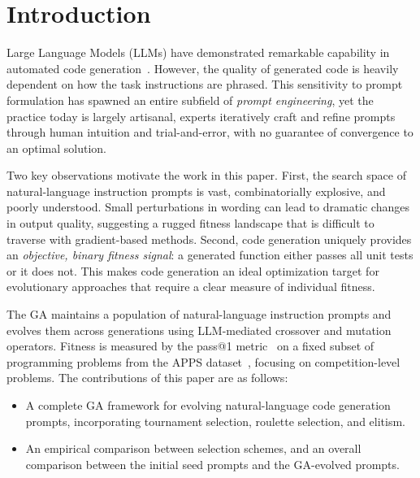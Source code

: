 \documentclass[conference]{IEEEtran}
\begin{document}
\section{Introduction}
\label{sec:intro}

Large Language Models (LLMs) have demonstrated remarkable capability in automated code
generation~\cite{chen2021codex}. However, the quality of generated code is heavily dependent
on how the task instructions are phrased. This sensitivity to prompt formulation has spawned
an entire subfield of \textit{prompt engineering}, yet the practice today is largely
artisanal, experts iteratively craft and refine prompts through human intuition and
trial-and-error, with no guarantee of convergence to an optimal solution.

Two key observations motivate the work in this paper. First, the search space of
natural-language instruction prompts is vast, combinatorially explosive, and poorly
understood. Small perturbations in wording can lead to dramatic changes in output quality,
suggesting a rugged fitness landscape that is difficult to traverse with gradient-based
methods. Second, code generation uniquely provides an \textit{objective, binary fitness
signal}: a generated function either passes all unit tests or it does not. This makes code
generation an ideal optimization target for evolutionary approaches that require a clear
measure of individual fitness.

The GA maintains a population of natural-language instruction prompts and evolves them
across generations using LLM-mediated crossover and mutation operators. Fitness is measured
by the pass@1 metric~\cite{chen2021codex} on a fixed subset of programming problems from
the APPS dataset~\cite{hendrycks2021apps}, focusing on competition-level problems. The contributions
of this paper are as follows:

\begin{itemize}
    \item A complete GA framework for evolving natural-language code generation prompts,
    incorporating tournament selection, roulette selection, and elitism.
    \item An empirical comparison between selection schemes, and an overall comparison
    between the initial seed prompts and the GA-evolved prompts.
\end{itemize}
\end{document}
